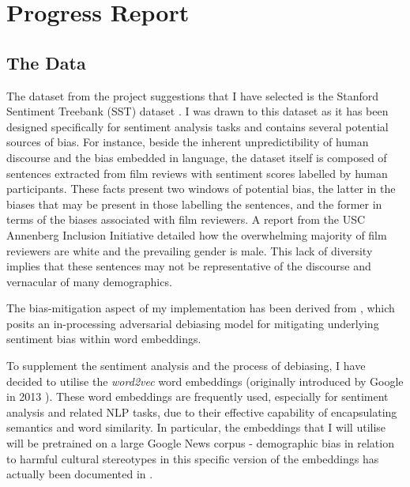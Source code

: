 \documentclass[a4paper]{IEEEtran}
\begin{document}
\section{Progress Report}

\subsection{The Data}

The dataset from the project suggestions that I have selected is the Stanford Sentiment Treebank (SST) dataset \cite{b4}. I was drawn to this dataset as it has been designed specifically for sentiment analysis tasks and contains several potential sources of bias. For instance, beside the inherent unpredictibility of human discourse and the bias embedded in language, the dataset itself is composed of sentences extracted from film reviews with sentiment scores labelled by human participants. These facts present two windows of potential bias, the latter in the biases that may be present in those labelling the sentences, and the former in terms of the biases associated with film reviewers. A report from the USC Annenberg Inclusion Initiative \cite{b5} detailed how the overwhelming majority of film reviewers are white and the prevailing gender is male. This lack of diversity implies that these sentences may not be representative of the discourse and vernacular of many demographics. %

The bias-mitigation aspect of my implementation has been derived from \cite{b6}, which posits an in-processing adversarial debiasing model for mitigating underlying sentiment bias within word embeddings. %

To supplement the sentiment analysis and the process of debiasing, I have decided to utilise the \textit{word2vec} word embeddings (originally introduced by Google in 2013 \cite{b7}). These word embeddings are frequently used, especially for sentiment analysis and related NLP tasks, due to their effective capability of encapsulating semantics and word similarity. In particular, the embeddings that I will utilise will be pretrained on a large Google News corpus - demographic bias in relation to harmful cultural stereotypes in this specific version of the embeddings has actually been documented in \cite{b8}. 
\end{document}
